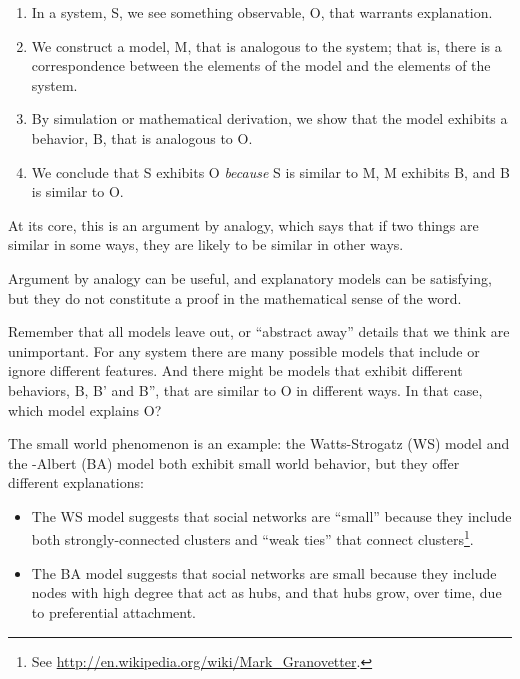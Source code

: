 \documentclass[10pt]{book}
\begin{document}
\begin{enumerate}

\item In a system, S, we see something observable, O, that warrants
  explanation.

\item We construct a model, M, that is analogous to the system; that
  is, there is a correspondence between the elements of the model and
  the elements of the system.

\item By simulation or mathematical derivation, we show that the model
  exhibits a behavior, B, that is analogous to O.

\item We conclude that S exhibits O {\em because} S is similar to M, M
  exhibits B, and B is similar to O.

\end{enumerate}

At its core, this is an argument by analogy, which says that if two
things are similar in some ways, they are likely to be similar in
other ways.

Argument by analogy can be useful, and explanatory models can be
satisfying, but they do not constitute a proof in the mathematical
sense of the word.

Remember that all models leave out, or ``abstract away''
details that we think are unimportant.  For any system there
are many possible models that include or ignore different features.
And there might be models that exhibit different behaviors,
B, B' and B'', that are similar to O in different ways.
In that case, which model explains O?

The small world phenomenon is an example: the
Watts-Strogatz (WS) model and the \Barabasi-Albert (BA) model
both exhibit small world behavior, but they offer different
explanations:

\begin{itemize}

\item The WS model suggests that social networks are ``small'' because
  they include both strongly-connected clusters and ``weak ties'' that
  connect clusters\footnote{See
    \url{http://en.wikipedia.org/wiki/Mark_Granovetter}.}.

\item The BA model suggests that social networks are small because
  they include nodes with high degree that act as hubs, and that
  hubs grow, over time, due to preferential attachment.

\end{itemize}
\end{document}
